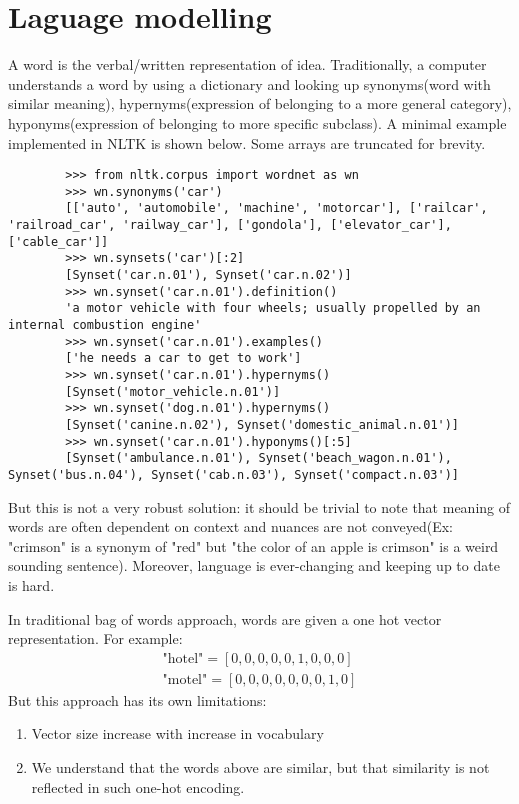 \documentclass[a4paper,oneside]{book}
\begin{document}
\section{Laguage modelling}

    A word is the verbal/written representation of idea. Traditionally, a computer understands a word by using a dictionary and looking up synonyms(word with similar meaning), hypernyms(expression of belonging to a more general category), hyponyms(expression of belonging to more specific subclass). A minimal example implemented in NLTK is shown below. Some arrays are truncated for brevity.
    \begin{lstlisting}
        >>> from nltk.corpus import wordnet as wn
        >>> wn.synonyms('car')
        [['auto', 'automobile', 'machine', 'motorcar'], ['railcar', 'railroad_car', 'railway_car'], ['gondola'], ['elevator_car'], ['cable_car']]
        >>> wn.synsets('car')[:2]
        [Synset('car.n.01'), Synset('car.n.02')]
        >>> wn.synset('car.n.01').definition()
        'a motor vehicle with four wheels; usually propelled by an internal combustion engine'
        >>> wn.synset('car.n.01').examples()
        ['he needs a car to get to work']
        >>> wn.synset('car.n.01').hypernyms()
        [Synset('motor_vehicle.n.01')]
        >>> wn.synset('dog.n.01').hypernyms()    
        [Synset('canine.n.02'), Synset('domestic_animal.n.01')]
        >>> wn.synset('car.n.01').hyponyms()[:5]
        [Synset('ambulance.n.01'), Synset('beach_wagon.n.01'), Synset('bus.n.04'), Synset('cab.n.03'), Synset('compact.n.03')]
    \end{lstlisting}
    But this is not a very robust solution: it should be trivial to note that meaning of words are often dependent on context and nuances are not conveyed(Ex: "crimson" is a synonym of "red" but "the color of an apple is crimson" is a weird sounding sentence).  Moreover, language is ever-changing and keeping up to date is hard. 
    \begin{marginfigure}%
        
    \end{marginfigure}%
    In traditional bag of words approach, words are given a one hot vector representation. For example:
    \begin{align*}
        \text{"hotel"}=[0,0,0,0,0,1,0,0,0]\\
        \text{"motel"}=[0,0,0,0,0,0,0,1,0]
    \end{align*}
    But this approach has its own limitations:
    \begin{enumerate}
        \item Vector size increase with increase in vocabulary
        \item We understand that the words above are similar, but that similarity is not reflected in such one-hot encoding.
    \end{enumerate}
\end{document}
